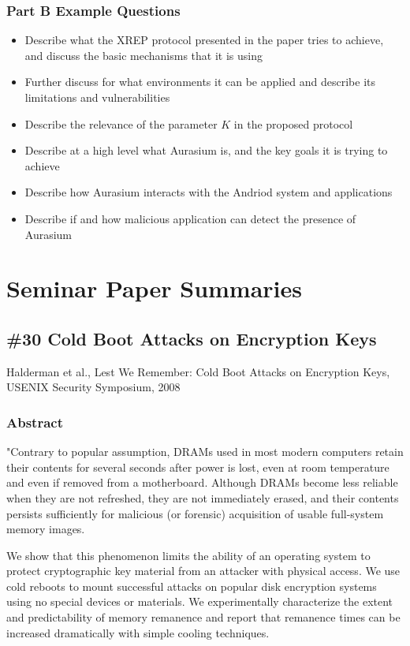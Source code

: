 \documentclass[12pt, a4paper]{article}
\begin{document}
\begin{multicols*}{2}
\subsubsection{Part B Example Questions}
\begin{itemize}
	\item Describe what the XREP protocol presented in the paper tries to achieve, and discuss the basic mechanisms that it is using
	\item Further discuss for what environments it can be applied and describe its limitations and vulnerabilities
	\item Describe the relevance of the parameter $K$ in the proposed protocol
	\item Describe at a high level what Aurasium is, and the key goals it is trying to achieve
	\item Describe how Aurasium interacts with the Andriod system and applications
	\item Describe if and how malicious application can detect the presence of Aurasium
\end{itemize}

\pagebreak
\section{Seminar Paper Summaries}
\subsection{\#30 Cold Boot Attacks on Encryption Keys}
Halderman et al., Lest We Remember: Cold Boot Attacks on Encryption Keys, USENIX Security Symposium, 2008
\subsubsection{Abstract}
"Contrary to popular assumption, DRAMs used in most modern computers retain their contents for several seconds after power is lost,
even at room temperature and even if removed from a motherboard. Although DRAMs become less reliable when they are not refreshed,
they are not immediately erased, and their contents persists sufficiently for malicious (or forensic) acquisition of usable full-system
memory images.

We show that this phenomenon limits the ability of an operating system to protect cryptographic key material from an attacker
with physical access. We use cold reboots to mount successful attacks on popular disk encryption systems using no special devices or
materials. We experimentally characterize the extent and predictability of memory remanence and report that remanence times can be
increased dramatically with simple cooling techniques.


\end{multicols*}
\end{document}
